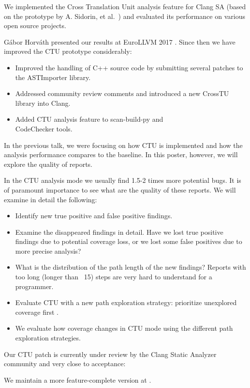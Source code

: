 \documentclass[sigconf]{acmart}
\begin{document}
We implemented the Cross Translation Unit analysis feature for Clang SA  
(based on the prototype by A. Sidorin, et al.~\cite{artemctu}) and evaluated 
its performance on various open source projects. 

G\'abor Horv\'ath presented our results at EuroLLVM 2017 \cite{eurollvm17}.
Since then we have improved the CTU prototype considerably: 
\begin{itemize}
\item Improved the handling of C++ source code by submitting several patches  
to the ASTImporter library.
\item Addressed community review comments and introduced a new CrossTU library into Clang.
\item Added CTU analysis feature to scan-build-py and\\ CodeChecker tools.
\end{itemize}

In the previous talk, we were focusing on how CTU is implemented and how the 
analysis performance compares to the baseline. In this poster, however, we will 
explore the quality of reports.

In the CTU analysis mode we usually find 1.5-2 times more potential bugs.
It is of paramount importance to see what are the quality of these reports.
We will examine in detail the following:
\begin{itemize}
\item Identify new true positive and false positive findings.
\item Examine the disappeared findings in detail. Have we lost true positive findings
due to potential coverage loss, or we lost some false positives due 
to more precise analysis?
\item What is the distribution of the path length of the new findings? Reports
with too long (longer than ~15) steps are very hard to understand for a programmer.
\item Evaluate CTU with a new path exploration strategy: prioritize unexplored coverage first \cite{karpenkov}.
\item We evaluate how coverage changes in CTU mode using the different path exploration strategies.
\end{itemize}

Our CTU patch is currently under review by the Clang Static Analyzer community
and very close to acceptance: \cite{patch}

We maintain a more feature-complete version at \cite{ericsson-ctu}.
\end{document}
